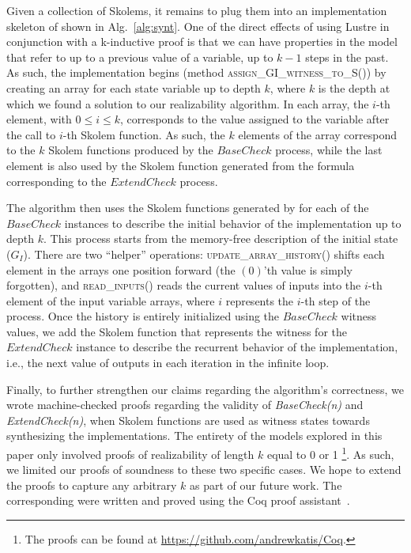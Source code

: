 Given a collection of Skolems, it remains to plug them into an implementation skeleton of
shown in Alg.~\ref{alg:synt}. One of the direct effects of using Lustre in
conjunction with a k-inductive proof is that we can have properties in the model
that refer to up to a previous value of a variable, up to $k-1$ steps in the
past. As such, the implementation begins (method
\textsc{assign\_GI\_witness\_to\_S()}) by creating an array for each state variable up to depth $k$,
where $k$ is the depth at which we found a solution to our realizability algorithm.
In each array, the $i$-th element, with $0\leq i \leq k$, corresponds to the
value assigned to the variable after the call to $i$-th Skolem function. As
such, the $k$ elements of the array correspond to the $k$ Skolem
functions produced by the $\mathit{BaseCheck}$ process, while the last element
is also used by the Skolem function generated from the formula corresponding to
the $\mathit{ExtendCheck}$ process.

The algorithm then uses the Skolem functions generated by \aeval for each
of the $\mathit{BaseCheck}$ instances to describe the initial behavior of
the implementation up to depth $k$.  This process starts from the memory-free
description of the initial state ($G_I$). 
There are two ``helper'' operations:
\textsc{update\_array\_history()} shifts each element in the arrays one position forward
(the $(0)$'th value is simply forgotten), and \textsc{read\_inputs()} reads the
current values of inputs into the $i$-th element of the input variable arrays,
where $i$ represents the $i$-th step of the process.
Once the history is entirely initialized using the $\mathit{BaseCheck}$ witness values,
we add the Skolem function that represents the witness for the
$\mathit{ExtendCheck}$ instance to describe the recurrent behavior of the implementation, i.e.,
the next value of outputs in each iteration in the infinite loop.

Finally, to further strengthen our claims regarding the algorithm's
correctness, we wrote machine-checked proofs regarding the validity of \textit{BaseCheck(n)} and
\textit{ExtendCheck(n)}, when Skolem functions are used as witness states
towards synthesizing the implementations. The entirety of the models explored in
this paper only involved proofs of realizability of length $k$ equal to 0 or
1%
\footnote{The proofs can be found at \url{https://github.com/andrewkatis/Coq}.}.
As such, we limited our proofs of soundness to these two specific cases. We hope
to extend the proofs to capture any arbitrary $k$ as part of our future work.
The corresponding were written and proved using the Coq proof
assistant~\cite{Coqmanual}.

